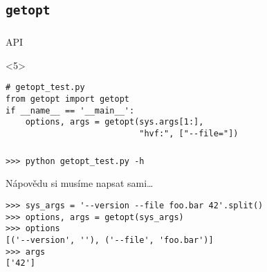 \subsection{\texttt{getopt}}
\begin{frame}[fragile]
\frametitle{\insertsection}
\framesubtitle{\insertsubsection}

\begin{beamerboxesrounded}{API}



\end{beamerboxesrounded}

\begin{uncoverenv}<5>
\begin{verbatim}
# getopt_test.py
from getopt import getopt
if __name__ == '__main__':
    options, args = getopt(sys.args[1:], 
                           "hvf:", ["--file="])
\end{verbatim}
\end{uncoverenv}
\end{frame}

\begin{frame}[fragile]
\frametitle{\insertsection}
\framesubtitle{\insertsubsection}

\begin{verbatim}
>>> python getopt_test.py -h
\end{verbatim}
\pause
Nápovědu si musíme napsat sami…

\pause
\begin{verbatim}
>>> sys_args = '--version --file foo.bar 42'.split()
>>> options, args = getopt(sys_args)
>>> options
[('--version', ''), ('--file', 'foo.bar')]
>>> args
['42']
\end{verbatim}


\end{frame}
